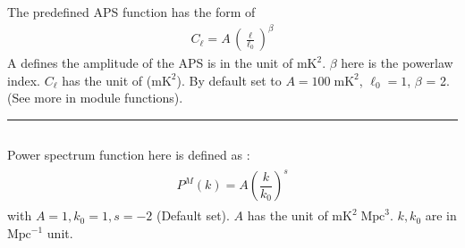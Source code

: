 \documentclass[a4paper,11pt,oneside,english,openany]{sphinxmanual}
\begin{document}
\sphinxAtStartPar
The pre\sphinxhyphen{}defined APS function  has the form of
\begin{equation*}
\begin{split}C_{\ell}=A\, \left(\frac{\ell}{\ell_0}\right)^{\beta}\end{split}
\end{equation*}
\sphinxAtStartPar
A defines the amplitude of the APS is in the unit of \(\text{mK}^2\). \(\beta\) here is the power\sphinxhyphen{}law index. \(C_{\ell}\) has the unit of  (\(\text{mK}^2\)). By default set to \(A = 100\;\text{mK}^2\), \(\ell_0=1\), \(\beta\) = \sphinxhyphen{}2. (See more in module functions).


\bigskip\hrule\bigskip



\subsection{}
\label{\detokenize{simvis:power-spectrum-function}}
\sphinxAtStartPar
Power spectrum function  here is defined as :
\begin{equation*}
\begin{split}\begin{align}
P^{M}(k) = A \left(\dfrac{k}{k_0}\right)^{s}
\end{align}\end{split}
\end{equation*}
\sphinxAtStartPar
with \(A=1, k_0=1, s=-2\) (Default set). \(A\) has the unit of \(\text{mK}^2\;\text{Mpc}^3\). \(k, k_0\) are in \(\text{Mpc}^{-1}\) unit.
\end{document}
